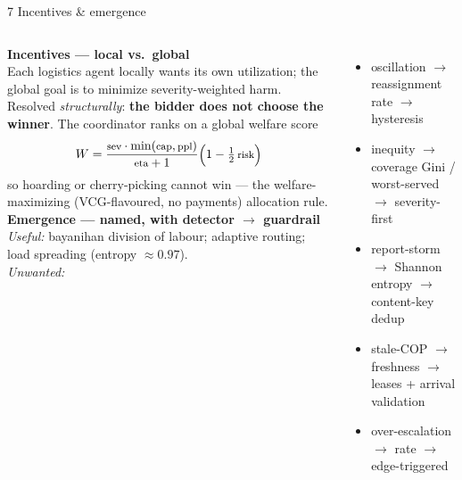 \documentclass[aspectratio=169,11pt]{beamer}
\begin{document}
\begin{frame}{7 \;\; Incentives \& emergence}
  \small
  \begin{columns}[T]
    \textbf{Incentives --- local vs.\ global}\\
    Each logistics agent locally wants its own utilization; the global goal is to minimize
    severity-weighted harm. Resolved \emph{structurally}: \textbf{the bidder does not choose the winner}.
    The coordinator ranks on a global welfare score
    \[\footnotesize W=\frac{\text{sev}\cdot\min(\text{cap},\text{ppl})}{\text{eta}+1}\Bigl(1-\tfrac12\,\text{risk}\Bigr)\]
    so hoarding or cherry-picking cannot win --- the welfare-maximizing (VCG-flavoured, no payments)
    allocation rule.
    \textbf{Emergence --- named, with detector $\to$ guardrail}\\
    \footnotesize
    \emph{Useful:} bayanihan division of labour; adaptive routing; load spreading (entropy $\approx0.97$).\\[2pt]
    \emph{Unwanted:}
    \begin{itemize}
      \item oscillation $\to$ reassignment rate $\to$ hysteresis
      \item inequity $\to$ coverage Gini / worst-served $\to$ severity-first
      \item report-storm $\to$ Shannon entropy $\to$ content-key dedup
      \item stale-COP $\to$ freshness $\to$ leases + arrival validation
      \item over-escalation $\to$ rate $\to$ edge-triggered
    \end{itemize}
  \end{columns}
\end{frame}
\end{document}
